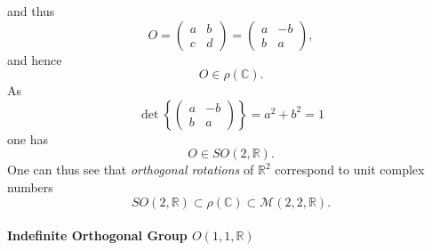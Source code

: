 \documentclass[aps,preprint]{revtex4}
\begin{document}
and thus%
\begin{equation}
O=\left( 
\begin{array}{cc}
a & b \\ 
c & d%
\end{array}%
\right) =\left( 
\begin{array}{cc}
a & -b \\ 
b & a%
\end{array}%
\right) ,
\end{equation}%
and hence 
\begin{equation}
O\in \rho \left( \mathbb{C}\right) .
\end{equation}%
As%
\begin{equation}
\det \left\{ \left( 
\begin{array}{cc}
a & -b \\ 
b & a%
\end{array}%
\right) \right\} =a^{2}+b^{2}=1
\end{equation}%
one has 
\begin{equation}
O\in SO\left( 2,\mathbb{R}\right) .
\end{equation}%
One can thus see that \emph{orthogonal rotations} of $\mathbb{R}^{2}$
correspond to unit complex numbers 
\begin{equation}
SO\left( 2,\mathbb{R}\right) \subset \rho \left( \mathbb{C}\right) \subset 
\mathcal{M}\left( 2,2,\mathbb{R}\right) .
\end{equation}

\paragraph{Indefinite Orthogonal Group $O\left( 1,1,\mathbb{R}\right) $}
\end{document}
